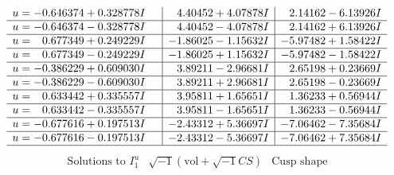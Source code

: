 \documentclass[1p]{elsarticle_modified}
\theoremstyle{definition}
\newcommand{\I}{\sqrt{-1}}
\begin{document}
$$\begin{array}{c|c|c}
\begin{aligned}
u &= -0.646374 + 0.328778 I\end{aligned}
 & \phantom{-}4.40452 + 4.07878 I & \phantom{-}2.14162 - 6.13926 I \\ \hline\begin{aligned}
u &= -0.646374 - 0.328778 I\end{aligned}
 & \phantom{-}4.40452 - 4.07878 I & \phantom{-}2.14162 + 6.13926 I \\ \hline\begin{aligned}
u &= \phantom{-}0.677349 + 0.249229 I\end{aligned}
 & -1.86025 - 1.15632 I & -5.97482 + 1.58422 I \\ \hline\begin{aligned}
u &= \phantom{-}0.677349 - 0.249229 I\end{aligned}
 & -1.86025 + 1.15632 I & -5.97482 - 1.58422 I \\ \hline\begin{aligned}
u &= -0.386229 + 0.609030 I\end{aligned}
 & \phantom{-}3.89211 - 2.96681 I & \phantom{-}2.65198 + 0.23669 I \\ \hline\begin{aligned}
u &= -0.386229 - 0.609030 I\end{aligned}
 & \phantom{-}3.89211 + 2.96681 I & \phantom{-}2.65198 - 0.23669 I \\ \hline\begin{aligned}
u &= \phantom{-}0.633442 + 0.335557 I\end{aligned}
 & \phantom{-}3.95811 + 1.65651 I & \phantom{-}1.36233 + 0.56944 I \\ \hline\begin{aligned}
u &= \phantom{-}0.633442 - 0.335557 I\end{aligned}
 & \phantom{-}3.95811 - 1.65651 I & \phantom{-}1.36233 - 0.56944 I \\ \hline\begin{aligned}
u &= -0.677616 + 0.197513 I\end{aligned}
 & -2.43312 + 5.36697 I & -7.06462 - 7.35684 I \\ \hline\begin{aligned}
u &= -0.677616 - 0.197513 I\end{aligned}
 & -2.43312 - 5.36697 I & -7.06462 + 7.35684 I\\
 \hline 
 \end{array}$$\newpage$$\begin{array}{c|c|c}  
\text{Solutions to }I^u_{1}& \I (\text{vol} + \sqrt{-1}CS) & \text{Cusp shape}\\

\end{array}$$
\end{document}
